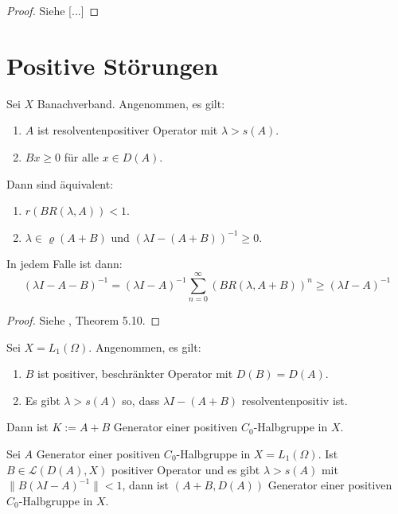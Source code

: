 \begin{proof}
Siehe \cite{} [...]
\end{proof}

\section{Positive Störungen}

\begin{satz}
Sei $X$ Banachverband. Angenommen, es gilt:
\begin{enumerate}
\item $A$ ist resolventenpositiver Operator mit $\lambda > s(A)$.
\item $Bx\geq0$ für alle $x\in D(A)$. 
\end{enumerate}
Dann sind äquivalent:
\begin{enumerate}
\item $r(BR(\lambda, A))<1$.
\item $\lambda\in\varrho(A+B)$ und $(\lambda I-(A+B))^{-1}\geq0$.
\end{enumerate}
In jedem Falle ist dann:
\begin{equation*}
(\lambda I-A-B)^{-1}=(\lambda I-A)^{-1}\sum_{n=0}^\infty (BR(\lambda, A+B))^n\geq(\lambda I-A)^{-1}
\end{equation*}
\end{satz}

\begin{proof}
Siehe \cite{banasiak_arlotti_2006}, Theorem 5.10.
\end{proof}

\begin{fsatz}
Sei $X=L_1(\Omega)$. Angenommen, es gilt:
\begin{enumerate}
\item $B$ ist positiver, beschränkter Operator mit $D(B)=D(A)$.
\item Es gibt $\lambda>s(A)$ so, dass $\lambda I-(A+B)$ resolventenpositiv ist.
\end{enumerate}
Dann ist $K:=A+B$ Generator einer positiven $C_0$-Halbgruppe in $X$.
\end{fsatz}

\begin{lem}
Sei $A$ Generator einer positiven $C_0$-Halbgruppe in $X=L_1(\Omega)$.  Ist $B\in\mathcal L(D(A), X)$ positiver Operator und es gibt $\lambda > s(A)$ mit $\|B(\lambda I-A)^{-1}\|< 1$, dann ist $(A+B, D(A))$ Generator einer positiven $C_0$-Halbgruppe in $X$.
\end{lem}

